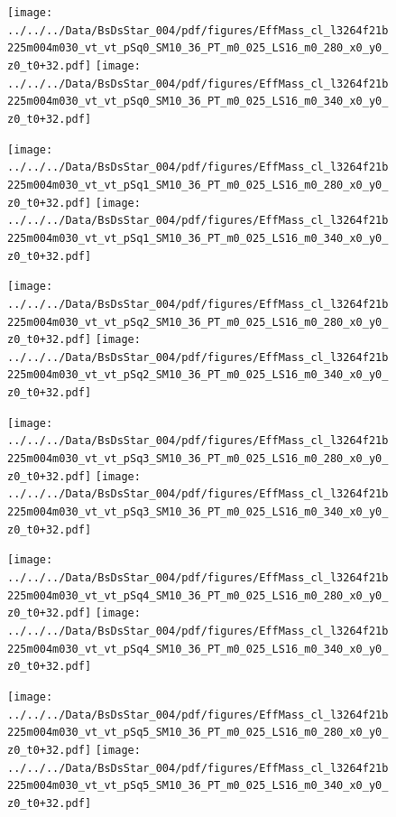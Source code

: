 \documentclass[a4paper,10pt]{article}
\begin{document}
\begin{figure}[p]
 \texttt{[image: ../../../Data/BsDsStar\_004/pdf/figures/EffMass\_cl\_l3264f21b225m004m030\_vt\_vt\_pSq0\_SM10\_36\_PT\_m0\_025\_LS16\_m0\_280\_x0\_y0\_z0\_t0+32.pdf]} 
 \texttt{[image: ../../../Data/BsDsStar\_004/pdf/figures/EffMass\_cl\_l3264f21b225m004m030\_vt\_vt\_pSq0\_SM10\_36\_PT\_m0\_025\_LS16\_m0\_340\_x0\_y0\_z0\_t0+32.pdf]} 
 \end{figure}
\begin{figure}[p]
 \texttt{[image: ../../../Data/BsDsStar\_004/pdf/figures/EffMass\_cl\_l3264f21b225m004m030\_vt\_vt\_pSq1\_SM10\_36\_PT\_m0\_025\_LS16\_m0\_280\_x0\_y0\_z0\_t0+32.pdf]} 
 \texttt{[image: ../../../Data/BsDsStar\_004/pdf/figures/EffMass\_cl\_l3264f21b225m004m030\_vt\_vt\_pSq1\_SM10\_36\_PT\_m0\_025\_LS16\_m0\_340\_x0\_y0\_z0\_t0+32.pdf]} 
 \end{figure}
\begin{figure}[p]
 \texttt{[image: ../../../Data/BsDsStar\_004/pdf/figures/EffMass\_cl\_l3264f21b225m004m030\_vt\_vt\_pSq2\_SM10\_36\_PT\_m0\_025\_LS16\_m0\_280\_x0\_y0\_z0\_t0+32.pdf]} 
 \texttt{[image: ../../../Data/BsDsStar\_004/pdf/figures/EffMass\_cl\_l3264f21b225m004m030\_vt\_vt\_pSq2\_SM10\_36\_PT\_m0\_025\_LS16\_m0\_340\_x0\_y0\_z0\_t0+32.pdf]} 
 \end{figure}
\clearpage
\begin{figure}[p]
 \texttt{[image: ../../../Data/BsDsStar\_004/pdf/figures/EffMass\_cl\_l3264f21b225m004m030\_vt\_vt\_pSq3\_SM10\_36\_PT\_m0\_025\_LS16\_m0\_280\_x0\_y0\_z0\_t0+32.pdf]} 
 \texttt{[image: ../../../Data/BsDsStar\_004/pdf/figures/EffMass\_cl\_l3264f21b225m004m030\_vt\_vt\_pSq3\_SM10\_36\_PT\_m0\_025\_LS16\_m0\_340\_x0\_y0\_z0\_t0+32.pdf]} 
 \end{figure}
\begin{figure}[p]
 \texttt{[image: ../../../Data/BsDsStar\_004/pdf/figures/EffMass\_cl\_l3264f21b225m004m030\_vt\_vt\_pSq4\_SM10\_36\_PT\_m0\_025\_LS16\_m0\_280\_x0\_y0\_z0\_t0+32.pdf]} 
 \texttt{[image: ../../../Data/BsDsStar\_004/pdf/figures/EffMass\_cl\_l3264f21b225m004m030\_vt\_vt\_pSq4\_SM10\_36\_PT\_m0\_025\_LS16\_m0\_340\_x0\_y0\_z0\_t0+32.pdf]} 
 \end{figure}
\begin{figure}[p]
 \texttt{[image: ../../../Data/BsDsStar\_004/pdf/figures/EffMass\_cl\_l3264f21b225m004m030\_vt\_vt\_pSq5\_SM10\_36\_PT\_m0\_025\_LS16\_m0\_280\_x0\_y0\_z0\_t0+32.pdf]} 
 \texttt{[image: ../../../Data/BsDsStar\_004/pdf/figures/EffMass\_cl\_l3264f21b225m004m030\_vt\_vt\_pSq5\_SM10\_36\_PT\_m0\_025\_LS16\_m0\_340\_x0\_y0\_z0\_t0+32.pdf]} 
 \end{figure}
\clearpage
\clearpage
\end{document}
